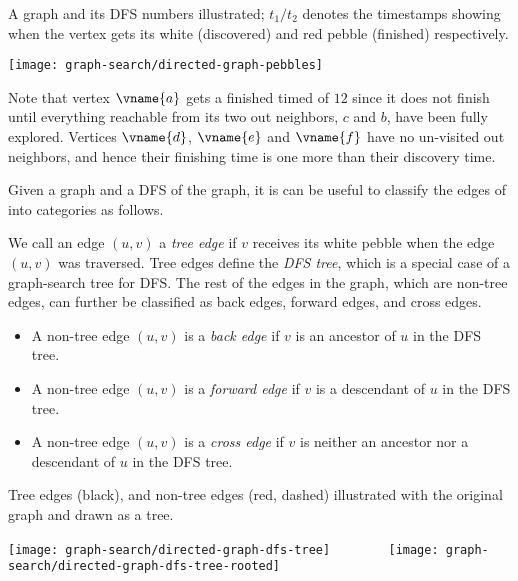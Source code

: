 \begin{example}
\label{ex:dfs::pebbles}
A graph and its DFS numbers illustrated; $t_1/t_2$ denotes the
timestamps showing when the vertex gets its white (discovered) and red
pebble (finished) respectively.
\begin{center}
\texttt{[image: graph-search/directed-graph-pebbles]}
\end{center}
Note that vertex $\vname{a}$ gets a finished timed of $12$ since it
does not finish until everything reachable from its two out neighbors,
$c$ and $b$, have been fully explored.  Vertices $\vname{d}$,
$\vname{e}$ and $\vname{f}$ have no un-visited out neighbors, and hence
their finishing time is one more than their discovery time.
\end{example}

Given a graph and a DFS of the graph, it is can be useful to classify
the edges of into categories as follows.

\begin{definition} 
We call an edge $(u,v)$ a {\em tree edge} if $v$ receives its white
pebble when the edge $(u,v)$ was traversed.  Tree edges define the
{\em DFS tree}, which is a special case of a graph-search tree for DFS.
%
The rest of the edges in the graph, which are non-tree edges, can
further be classified as back edges, forward edges, and cross edges.
\begin{itemize}
\item 
A non-tree edge $(u,v)$ is a {\em back edge} if $v$ is an ancestor of
$u$ in the DFS tree.

\item
A non-tree edge $(u,v)$ is a {\em forward edge} if $v$ is a descendant
of $u$ in the DFS tree.

\item
A non-tree edge $(u,v)$ is a {\em cross edge} if $v$ is neither an
ancestor nor a descendant of $u$ in the DFS tree.
\end{itemize}
\end{definition}


\begin{example}
Tree edges (black), and non-tree edges (red, dashed) illustrated with
the original graph and drawn as a tree.  

\begin{center}
\texttt{[image: graph-search/directed-graph-dfs-tree]}
~~~~~~~
\texttt{[image: graph-search/directed-graph-dfs-tree-rooted]}
\end{center}
\label{ex:dfs::dfs-tree}
\end{example}


